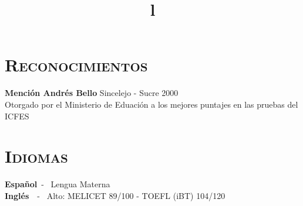 \begin{resume}

\section{\textsc{Reconocimientos}}
\textbf{Menci\'{o}n Andr\'{e}s Bello} \hfill  Sincelejo - Sucre 2000  \\
Otorgado por el Ministerio de Eduaci\'{o}n a los mejores puntajes en
las pruebas del ICFES \hfill \\

\section{\textsc{Idiomas}}
\textbf{Espa\~{n}ol}\   - \  Lengua Materna \\
\textbf{Ingl\'{e}s}\ \  - \  Alto:  MELICET 89/100 - TOEFL (iBT) 104/120\\




\begin{formatb}
  \title{l}\\
 \\
  \body\\
\end{formatb}


\end{resume}
